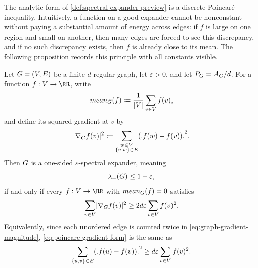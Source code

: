 The analytic form of \cref{def:spectral-expander-preview} is a discrete Poincaré inequality. Intuitively, a function on a good expander cannot be nonconstant without paying a substantial amount of energy across edges: if \(f\) is large on one region and small on another, then many edges are forced to see this discrepancy, and if no such discrepancy exists, then \(f\) is already close to its mean. The following proposition records this principle with all constants visible.

\begin{proposition}
	\label{prop:spectral-poincare}
	Let \(G=(V,E)\) be a finite \(d\)-regular graph, let \(\varepsilon>0\), and let \(P_{G}=A_{G}/d\). For a function \(f:\Vertices\to\RR\), write
	\begin{equation}
		\label{eq:graph-mean-uniform}
		mean_{G}(f)\coloneqq \frac{1}{\lvert V\rvert}\sum_{v\in V}f(v),
	\end{equation}
	and define its squared gradient at \(v\) by
	\begin{equation}
		\label{eq:graph-gradient-magnitude}
		\abs{\nabla_{\Graph} f(v)}^2\coloneqq \sum_{\substack{w\in\Vertices\\ \{v,w\}\in\Edges}}\bigl(f(w)-f(v)\bigr)^2.
	\end{equation}
	Then \(G\) is a one-sided \(\varepsilon\)-spectral expander, meaning
	\begin{equation}
		\label{eq:poincare-spectral-assumption}
		\lambda_+(G)\leq 1-\varepsilon,
	\end{equation}
	if and only if every \(f:\Vertices\to\RR\) with \(mean_{G}(f)=0\) satisfies
	\begin{equation}
		\label{eq:poincare-gradient-form}
		\sum_{v\in V}\lvert\nabla_{G} f(v)\rvert^2
		\geq 2d\varepsilon\sum_{v\in V}f(v)^2.
	\end{equation}
	Equivalently, since each unordered edge is counted twice in \cref{eq:graph-gradient-magnitude}, \cref{eq:poincare-gradient-form} is the same as
	\begin{equation}
		\label{eq:poincare-edge-form}
		\sum_{\{u,v\}\in\Edges}\bigl(f(u)-f(v)\bigr)^2
		\geq d\varepsilon\sum_{v\in\Vertices}f(v)^2.
	\end{equation}
\end{proposition}

